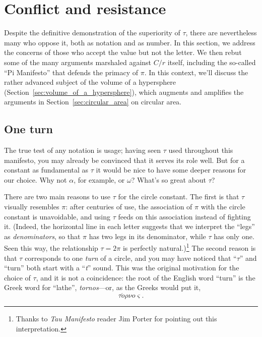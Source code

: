 

\section{Conflict and resistance} %
\label{sec:conflict_and_resistance}

Despite the definitive demonstration of the superiority of $\tau$, there are nevertheless many who oppose it, both as notation and as number. In this section, we address the concerns of those who accept the value but not the letter. We then rebut some of the many arguments marshaled against $C/r$ itself, including the so-called ``Pi Manifesto'' that defends the primacy of $\pi$. In this context, we'll discuss the rather advanced subject of the volume of a hypersphere (Section~\ref{sec:volume_of_a_hypersphere}), which augments and amplifies the arguments in Section~\ref{sec:circular_area} on circular area.

  \subsection{One turn} %
  \label{sec:one_turn}

The true test of any notation is usage; having seen $\tau$ used throughout this manifesto, you may already be convinced that it serves its role well. But for a constant as fundamental as $\tau$ it would be nice to have some deeper reasons for our choice. Why not $\alpha$, for example, or $\omega$? What's so great about $\tau$?

There are two main reasons to use $\tau$ for the circle constant. The first is that $\tau$ visually resembles $\pi$: after centuries of use, the association of $\pi$ with the circle constant is unavoidable, and using $\tau$ feeds on this association instead of fighting it. (Indeed, the horizontal line in each letter suggests that we interpret the ``legs'' as \emph{denominators}, so that $\pi$ has two legs in its denominator, while $\tau$ has only one. Seen this way, the relationship $\tau = 2\pi$ is perfectly natural.)\footnote{Thanks to \emph{Tau Manifesto} reader Jim Porter for pointing out this interpretation.} The second reason is that $\tau$ corresponds to one \emph{turn} of a circle, and you may have noticed that ``$\tau$'' and ``turn'' both start with a ``\emph{t}'' sound. This was the original motivation for the choice of $\tau$, and it is not a coincidence: the root of the English word ``turn'' is the Greek word for ``lathe'', \emph{tornos}---or, as the Greeks would put it, \[ \tau \acute{o}\rho\nu o\varsigma. \]

